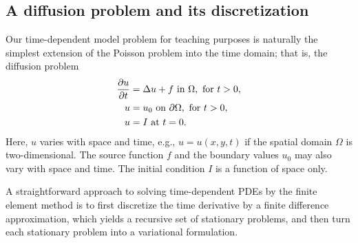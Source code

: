 \subsection{A diffusion problem and its discretization}
\label{langtangen:timedep:diffusion1}

Our time-dependent
model problem for teaching purposes is naturally the simplest
extension of the Poisson problem into the time domain; that is,
the diffusion problem
\begin{align}
\frac{\partial u}{\partial t} &= \Delta u + f \mbox{ in } \Omega, \hbox{ for } t>0,
\label{langtangen:diffusion:pde1}
\\
    u &= u_0 \mbox{ on } \partial \Omega,\hbox{ for } t>0,
\label{langtangen:diffusion:pde1:bc}
\\
    u &= I   \mbox{ at } t=0.
\label{langtangen:diffusion:pde1:ic}
\end{align}
Here, $u$ varies with space and time, e.g., $u=u(x,y,t)$ if the spatial
domain $\Omega$ is two-dimensional. The source function $f$ and the
boundary values $u_0$ may also vary with space and time.  The initial
condition $I$ is a function of space only.

A straightforward approach to solving time-dependent PDEs by the finite
element method is to first discretize the time derivative by a finite
difference approximation, which yields a recursive set of stationary
problems, and then turn each stationary problem into a variational
formulation.

